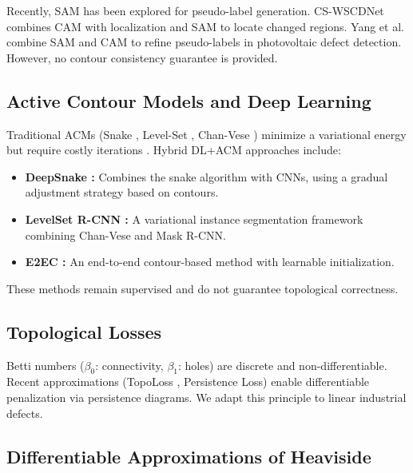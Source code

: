 \documentclass[12pt, a4paper]{article}
\begin{document}
Recently, SAM \cite{kirillov2023segment} has been explored for pseudo-label generation. CS-WSCDNet \cite{cs2024} combines CAM with localization and SAM to locate changed regions. Yang et al. \cite{yang2024sam} combine SAM and CAM to refine pseudo-labels in photovoltaic defect detection. However, no contour consistency guarantee is provided.

\subsection{Active Contour Models and Deep Learning}
\label{subsec:acm_dl}

Traditional ACMs (Snake \cite{kass1988snakes}, Level-Set \cite{osher1988fronts}, Chan-Vese \cite{chan2001active}) minimize a variational energy but require costly iterations \cite{review2025}. Hybrid DL+ACM approaches include:

\begin{itemize}
    \item \textbf{DeepSnake \cite{peng2020deepsnake}:} Combines the snake algorithm with CNNs, using a gradual adjustment strategy based on contours.
    \item \textbf{LevelSet R-CNN \cite{chen2020levelset}:} A variational instance segmentation framework combining Chan-Vese and Mask R-CNN.
    \item \textbf{E2EC \cite{qi2022e2ec}:} An end-to-end contour-based method with learnable initialization.
\end{itemize}

These methods remain supervised and do not guarantee topological correctness.

\subsection{Topological Losses}
\label{subsec:topological_losses}

Betti numbers ($\beta_0$: connectivity, $\beta_1$: holes) are discrete and non-differentiable. Recent approximations (TopoLoss \cite{kafer2020topological}, Persistence Loss) enable differentiable penalization via persistence diagrams. We adapt this principle to linear industrial defects.

\subsection{Differentiable Approximations of Heaviside}
\label{subsec:heaviside_approx}
\end{document}
